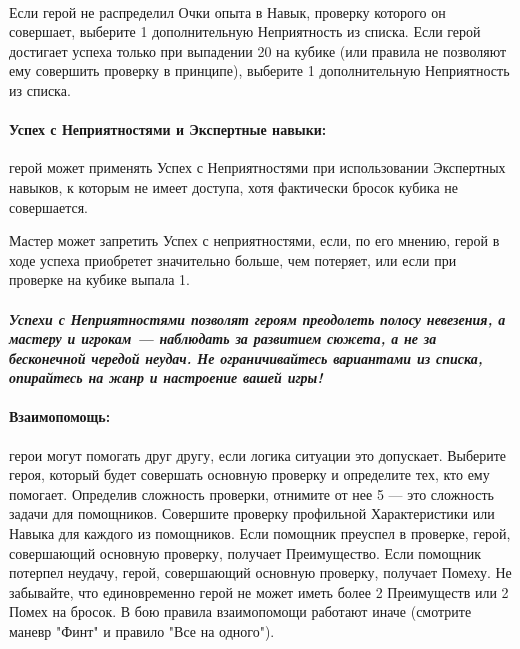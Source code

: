 \paragraph{}Если герой не распределил Очки опыта в Навык, проверку которого он совершает, выберите 1 дополнительную Неприятность из списка.
Если герой достигает успеха только при выпадении 20 на кубике (или правила не позволяют ему совершить проверку в принципе), выберите 1 дополнительную Неприятность из списка.
\paragraph{Успех с Неприятностями и Экспертные навыки:} герой может применять Успех с Неприятностями при использовании Экспертных навыков, к которым не имеет доступа, хотя фактически бросок кубика не совершается.
\begin{tcolorbox}
Мастер может запретить Успех с неприятностями, если, по его мнению, герой в ходе успеха приобретет значительно больше, чем потеряет, или если при проверке на кубике выпала 1.
\end{tcolorbox}
\paragraph{\textit{Успехи с Неприятностями позволят героям преодолеть полосу невезения, а мастеру и игрокам — наблюдать за развитием сюжета, а не за бесконечной чередой неудач. Не ограничивайтесь вариантами из списка, опирайтесь на жанр и настроение вашей игры!}}
\paragraph{Взаимопомощь:} герои могут помогать друг другу, если логика ситуации это допускает. Выберите героя, который будет совершать основную проверку и определите тех, кто ему помогает. Определив сложность проверки, отнимите от нее 5 — это сложность задачи для помощников. Совершите проверку профильной Характеристики или Навыка для каждого из помощников. Если помощник преуспел в проверке, герой, совершающий основную проверку, получает Преимущество. Если помощник потерпел неудачу, герой, совершающий основную проверку, получает Помеху. Не забывайте, что единовременно герой не может иметь более 2 Преимуществ или 2 Помех на бросок.
\newline В бою правила взаимопомощи работают иначе (смотрите маневр "Финт" и правило "Все на одного").